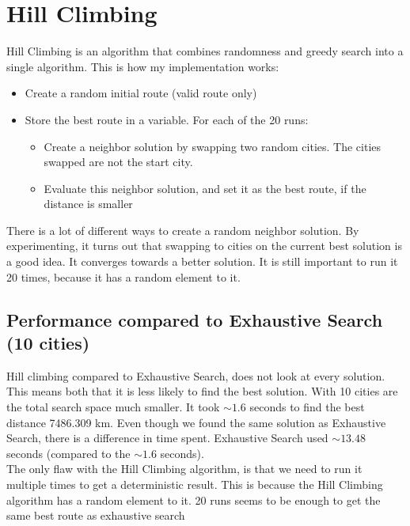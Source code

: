 \documentclass{article}
\begin{document}
    \section{Hill Climbing}

    Hill Climbing is an algorithm that combines randomness and greedy search into a single algorithm.
    This is how my implementation works:
    \begin{itemize}
        \item Create a random initial route (valid route only)
        \item Store the best route in a variable. For each of the 20 runs: 
        \begin{itemize}
            \item Create a neighbor solution by swapping two random cities. The cities swapped are not the start city. 
            \item Evaluate this neighbor solution, and set it as the best route, if the distance is smaller
        \end{itemize}
    \end{itemize}


    There is a lot of different ways to create a random neighbor solution. By experimenting, it turns out that swapping to cities on the current best solution is a good idea. 
    It converges towards a better solution. It is still important to run it 20 times, because it has a random element to it. 

    \subsection{Performance compared to Exhaustive Search (10 cities)}

    Hill climbing compared to Exhaustive Search, does not look at every solution. This means both that it is less likely to find the best solution.
    With 10 cities are the total search space much smaller. It took $\sim1.6$ seconds to find the best distance 7486.309 km. Even though we found the same solution as Exhaustive Search, there is a difference in time spent.
    Exhaustive Search used  $\sim13.48$ seconds (compared to the   $\sim1.6$ seconds). \\

    The only flaw with the Hill Climbing algorithm, is that we need to run it multiple times to get a deterministic result. This is because the Hill Climbing algorithm has a random element to it. 
    20 runs seems to be enough to get the same best route as exhaustive search 
\end{document}
